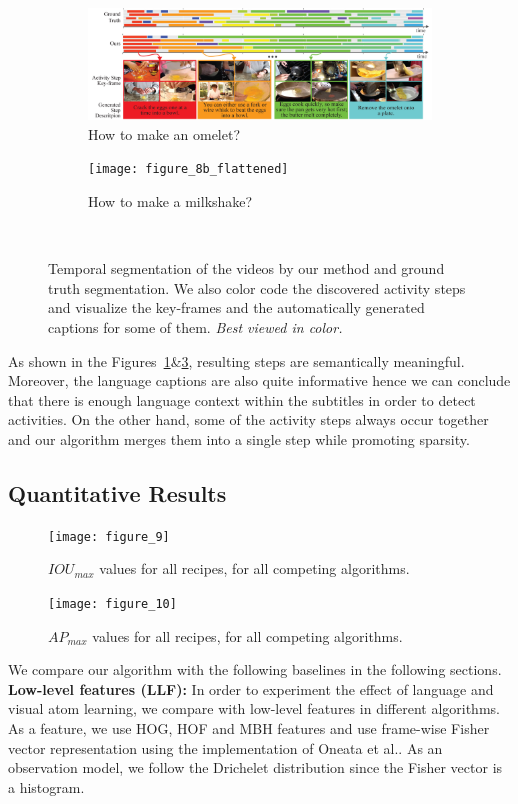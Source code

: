 \begin{figure}[ht]
  \begin{subfigure}[b]{\textwidth}
    \includegraphics[width=\textwidth]{figure_8a_flattened}
    \caption{How to make an omelet?}
    \label{recipe:ommelette}
  \end{subfigure}

  \begin{subfigure}[b]{\textwidth}
    \texttt{[image: figure\_8b\_flattened]}
    \caption{How to make a milkshake?}
    \label{recipe:milkshake}
  \end{subfigure}~
\caption{Temporal segmentation of the videos by our method and ground truth segmentation. We also color code the discovered activity steps and visualize  the key-frames and the automatically generated captions for some of them. \emph{Best viewed in color.}}
\end{figure}

As shown in the Figures~\ref{recipe:ommelette}\&\ref{recipe:milkshake}, resulting steps are semantically meaningful. Moreover, the language captions are also quite informative hence we can conclude that there is enough language context within the subtitles in order to detect activities. On the other hand, some of the activity steps always occur together and our algorithm merges them into a single step while promoting sparsity.
\subsection{Quantitative Results}
\begin{figure}[t]
  \texttt{[image: figure\_9]}
  \caption{$IOU_{max}$ values for all recipes, for all competing algorithms.}
  \label{mIOU}
\texttt{[image: figure\_10]}
\caption{$AP_{max}$ values for all recipes, for all competing algorithms.}
\label{mmAP}
\end{figure}

We compare our algorithm with the following baselines in the following sections.
\noindent\textbf{Low-level features (LLF):}
In order to experiment the effect of language and visual atom learning, we compare with low-level features in different algorithms. As a feature, we use HOG, HOF and MBH features and use frame-wise Fisher vector representation using the implementation of Oneata et al.\cite{fastLaptev}. As an observation model, we follow the Drichelet distribution since the Fisher vector is a histogram.

